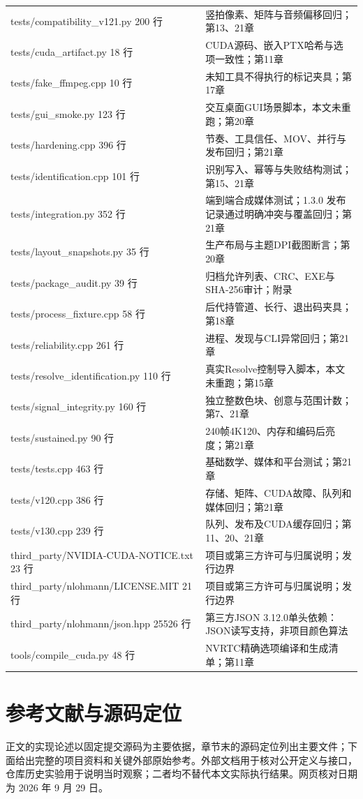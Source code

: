 \documentclass[UTF8,zihao=-4,openany]{ctexbook}
\begin{document}
\begin{longtable}{p{.43\linewidth}p{.47\linewidth}}
tests/compatibility\_v121.py
200 行 & 竖拍像素、矩阵与音频偏移回归；第13、21章\\
tests/cuda\_artifact.py
18 行 & CUDA源码、嵌入PTX哈希与选项一致性；第11章\\
tests/fake\_ffmpeg.cpp
10 行 & 未知工具不得执行的标记夹具；第17章\\
tests/gui\_smoke.py
123 行 & 交互桌面GUI场景脚本，本文未重跑；第20章\\
tests/hardening.cpp
396 行 & 节奏、工具信任、MOV、并行与发布回归；第21章\\
tests/identification.cpp
101 行 & 识别写入、幂等与失败结构测试；第15、21章\\
tests/integration.py
352 行 & 端到端合成媒体测试；1.3.0 发布记录通过明确冲突与覆盖回归；第21章\\
tests/layout\_snapshots.py
35 行 & 生产布局与主题DPI截图断言；第20章\\
tests/package\_audit.py
39 行 & 归档允许列表、CRC、EXE与SHA-256审计；附录\\
tests/process\_fixture.cpp
58 行 & 后代持管道、长行、退出码夹具；第18章\\
tests/reliability.cpp
261 行 & 进程、发现与CLI异常回归；第21章\\
tests/resolve\_identification.py
110 行 & 真实Resolve控制导入脚本，本文未重跑；第15章\\
tests/signal\_integrity.py
160 行 & 独立整数色块、创意与范围计数；第7、21章\\
tests/sustained.py
90 行 & 240帧4K120、内存和编码后亮度；第21章\\
tests/tests.cpp
463 行 & 基础数学、媒体和平台测试；第21章\\
tests/v120.cpp
386 行 & 存储、矩阵、CUDA故障、队列和媒体回归；第21章\\
tests/v130.cpp
239 行 & 队列、发布及CUDA缓存回归；第11、20、21章\\
third\_party/NVIDIA-CUDA-NOTICE.txt
23 行 & 项目或第三方许可与归属说明；发行边界\\
third\_party/nlohmann/LICENSE.MIT
21 行 & 项目或第三方许可与归属说明；发行边界\\
third\_party/nlohmann/json.hpp
25526 行 & 第三方JSON 3.12.0单头依赖：JSON读写支持，非项目颜色算法\\
tools/compile\_cuda.py
48 行 & NVRTC精确选项编译和生成清单；第11章\\\bottomrule\end{longtable}

\chapter*{参考文献与源码定位}
正文的实现论述以固定提交源码为主要依据，章节末的源码定位列出主要文件；下面给出完整的项目资料和关键外部原始参考。外部文档用于核对公开定义与接口，仓库历史实验用于说明当时观察；二者均不替代本文实际执行结果。网页核对日期为 2026 年 9 月 29 日。
\end{document}
